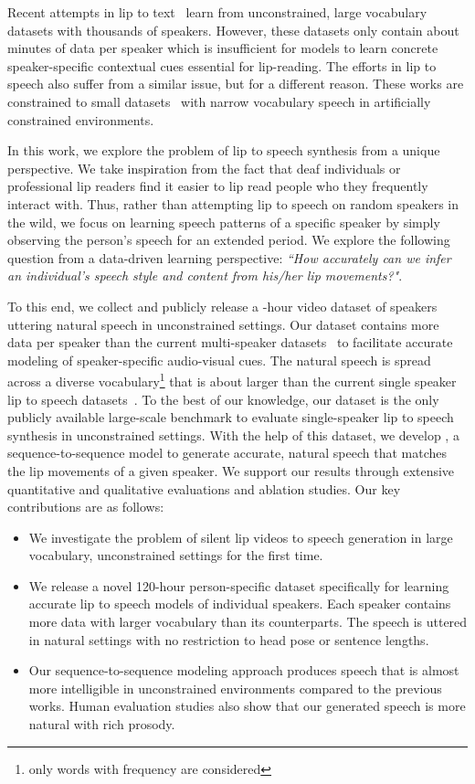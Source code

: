\documentclass[10pt,twocolumn,letterpaper]{article}
\begin{document}
Recent attempts in lip to text~\cite{Afouras2018DeepLR,chung2017lip} learn from unconstrained, large vocabulary datasets with thousands of speakers. However, these datasets only contain about  minutes of data per speaker which is insufficient for models to learn concrete speaker-specific contextual cues essential for lip-reading. The efforts in lip to speech also suffer from a similar issue, but for a different reason. These works are constrained to small datasets~\cite{cooke2006audio} with narrow vocabulary speech in artificially constrained environments. 

In this work, we explore the problem of lip to speech synthesis from a unique perspective. We take inspiration from the fact that deaf individuals or professional lip readers find it easier to lip read people who they frequently interact with. Thus, rather than attempting lip to speech on random speakers in the wild, we focus on learning speech patterns of a specific speaker by simply observing the person's speech for an extended period. We explore the following question from a data-driven learning perspective: \textit{``How accurately can we infer an individual’s speech style and content from his/her lip movements?"}.

To this end, we collect and publicly release a -hour video dataset of  speakers uttering natural speech in unconstrained settings. Our \modelname dataset contains  more data per speaker than the current multi-speaker datasets~\cite{Afouras2018DeepLR} to facilitate accurate modeling of speaker-specific audio-visual cues. The natural speech is spread across a diverse vocabulary\footnote{only words with frequency  are considered} that is about  larger than the current single speaker lip to speech datasets~\cite{cooke2006audio,harte2015tcd}. To the best of our knowledge, our dataset is the only publicly available large-scale benchmark to evaluate single-speaker lip to speech synthesis in unconstrained settings. With the help of this dataset, we develop \modelnamewithoutspace, a sequence-to-sequence model to generate accurate, natural speech that matches the lip movements of a given speaker. We support our results through extensive quantitative and qualitative evaluations and ablation studies. Our key contributions are as follows:

\begin{itemize}
    \item We investigate the problem of silent lip videos to speech generation in large vocabulary, unconstrained settings for the first time.
    \item We release a novel 120-hour person-specific \modelname dataset specifically for learning accurate lip to speech models of individual speakers. Each speaker contains  more data with  larger vocabulary than its counterparts. The speech is uttered in natural settings with no restriction to head pose or sentence lengths.
    \item Our sequence-to-sequence modeling approach produces speech that is almost  more intelligible in unconstrained environments compared to the previous works. Human evaluation studies also show that our generated speech is more natural with rich prosody.
\end{itemize}
\end{document}
